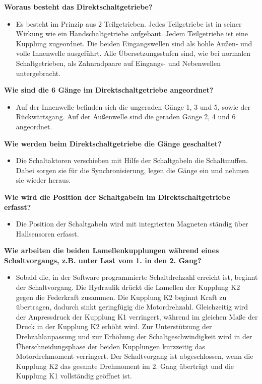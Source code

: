 \textbf{Woraus besteht das Direktschaltgetriebe?}

\begin{itemize}
\item
  Es besteht im Prinzip aus 2 Teilgetrieben. Jedes Teilgetriebe ist in
  seiner Wirkung wie ein Handschaltgetriebe aufgebaut. Jedem
  Teilgetriebe ist eine Kupplung zugeordnet. Die beiden Eingangswellen
  sind als hohle Außen- und volle Innenwelle ausgeführt. Alle
  Übersetzungsstufen sind, wie bei normalen Schaltgetrieben, als
  Zahnradpaare auf Eingangs- und Nebenwellen untergebracht.
\end{itemize}

\textbf{Wie sind die 6 Gänge im Direktschaltgetriebe angeordnet?}

\begin{itemize}
\item
  Auf der Innenwelle befinden sich die ungeraden Gänge 1, 3 und 5, sowie
  der Rückwärtsgang. Auf der Außenwelle sind die geraden Gänge 2, 4 und
  6 angeordnet.
\end{itemize}

\textbf{Wie werden beim Direktschaltgetriebe die Gänge geschaltet?}

\begin{itemize}
\item
  Die Schaltaktoren verschieben mit Hilfe der Schaltgabeln die
  Schaltmuffen. Dabei sorgen sie für die Synchronisierung, legen die
  Gänge ein und nehmen sie wieder heraus.
\end{itemize}

\textbf{Wie wird die Position der Schaltgabeln im Direktschaltgetriebe
erfasst?}

\begin{itemize}
\item
  Die Position der Schaltgabeln wird mit integrierten Magneten ständig
  über Hallsensoren erfasst.
\end{itemize}

\textbf{Wie arbeiten die beiden Lamellenkupplungen während eines
Schaltvorgangs, z.B. unter Last vom 1. in den 2. Gang?}

\begin{itemize}
\item
  Sobald die, in der Software programmierte Schaltdrehzahl erreicht ist,
  beginnt der Schaltvorgang. Die Hydraulik drückt die Lamellen der
  Kupplung K2 gegen die Federkraft zusammen. Die Kupplung K2 beginnt
  Kraft zu übertragen, dadurch sinkt geringfügig die Motordrehzahl.
  Gleichzeitig wird der Anpressdruck der Kupplung K1 verringert, während
  im gleichen Maße der Druck in der Kupplung K2 erhöht wird. Zur
  Unterstützung der Drehzahlanpassung und zur Erhöhung der
  Schaltgeschwindigkeit wird in der Überschneidungsphase der beiden
  Kupplungen kurzzeitig das Motordrehmoment verringert. Der
  Schaltvorgang ist abgeschlossen, wenn die Kupplung K2 das gesamte
  Drehmoment im 2. Gang überträgt und die Kupplung K1 vollständig
  geöffnet ist.
\end{itemize}
